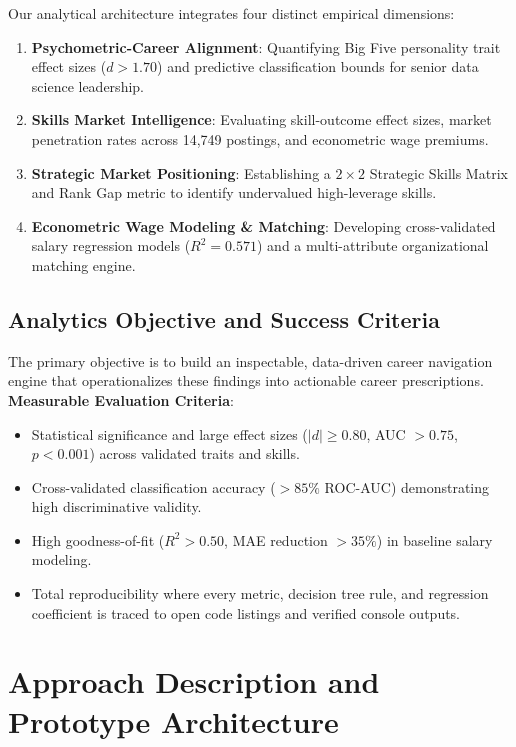 \documentclass[conference]{IEEEtran}
\begin{document}
Our analytical architecture integrates four distinct empirical dimensions:
\begin{enumerate}
    \item \textbf{Psychometric-Career Alignment}: Quantifying Big Five personality trait effect sizes ($d > 1.70$) and predictive classification bounds for senior data science leadership.
    \item \textbf{Skills Market Intelligence}: Evaluating skill-outcome effect sizes, market penetration rates across 14,749 postings, and econometric wage premiums.
    \item \textbf{Strategic Market Positioning}: Establishing a $2 \times 2$ Strategic Skills Matrix and Rank Gap metric to identify undervalued high-leverage skills.
    \item \textbf{Econometric Wage Modeling \& Matching}: Developing cross-validated salary regression models ($R^2 = 0.571$) and a multi-attribute organizational matching engine.
\end{enumerate}

\subsection{Analytics Objective and Success Criteria}

The primary objective is to build an inspectable, data-driven career navigation engine that operationalizes these findings into actionable career prescriptions.
\textbf{Measurable Evaluation Criteria}:
\begin{itemize}
    \item Statistical significance and large effect sizes ($|d| \ge 0.80$, AUC $> 0.75$, $p < 0.001$) across validated traits and skills.
    \item Cross-validated classification accuracy ($> 85\%$ ROC-AUC) demonstrating high discriminative validity.
    \item High goodness-of-fit ($R^2 > 0.50$, MAE reduction $> 35\%$) in baseline salary modeling.
    \item Total reproducibility where every metric, decision tree rule, and regression coefficient is traced to open code listings and verified console outputs.
\end{itemize}

\section{Approach Description and Prototype Architecture}
\end{document}
